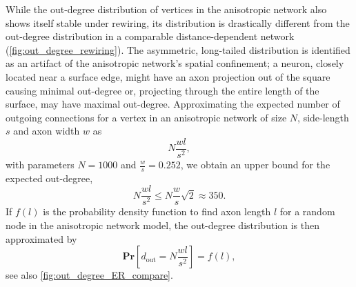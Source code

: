 While the out-degree distribution of vertices in the anisotropic
network also shows itself stable under rewiring, its distribution is
drastically different from the out-degree distribution in a comparable
distance-dependent network (\autoref{fig:out_degree_rewiring}). The
asymmetric, long-tailed distribution is identified as an artifact of
the anisotropic network's spatial confinement; a neuron, closely
located near a surface edge, might have an axon projection out of the
square causing minimal out-degree or, projecting through the entire
length of the surface, may have maximal out-degree. 
%
%
%
Approximating the expected number of outgoing connections for a vertex
in an anisotropic network of size $N$, side-length $s$ and axon
width $w$ as 
\[
N \frac{w l}{s^2},
\]
with parameters $N = 1000$ and $\frac{w}{s} = 0.252$, we obtain an
upper bound for the expected out-degree, 
\[
N \frac{w l}{s^2} \leq N\frac{w}{s} \sqrt{2} \approx 350.
\]
If $f(l)$ is the probability density function to find axon length $l$
for a random node in the anisotropic network model, the out-degree
distribution is then approximated by
\[
\mathbf{Pr}[d_{\mathrm{out}} =  N \frac{w l}{s^2}] = f(l),  
\]
see also \autoref{fig:out_degree_ER_compare}.




